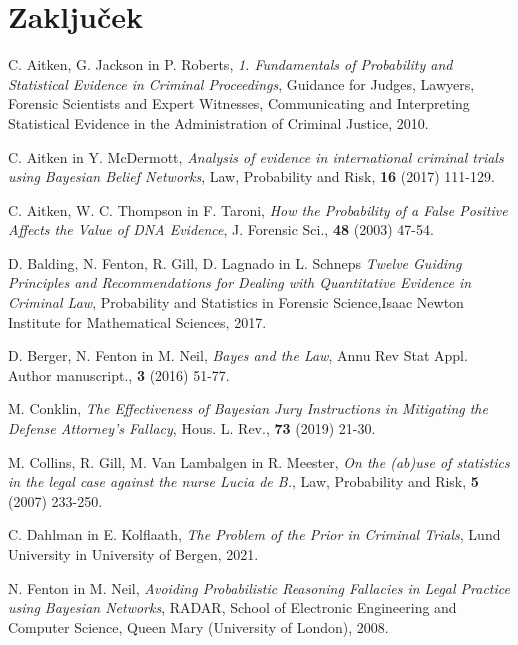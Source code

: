 \documentclass[mat1, tisk]{fmfdelo}
\theoremstyle{definition} %
\theoremstyle{trditev} %
\theoremstyle{izrek}
\begin{document}
\section{Zaključek}

\begin{thebibliography}{99}
        C. Aitken, G. Jackson in P. Roberts, \emph{1. Fundamentals of Probability and Statistical Evidence in Criminal Proceedings}, Guidance for Judges, Lawyers, Forensic Scientists and Expert Witnesses, Communicating and Interpreting Statistical Evidence in the Administration of Criminal Justice, 2010.

        C. Aitken in Y. McDermott, \emph{Analysis of evidence in international criminal trials using Bayesian Belief Networks}, Law, Probability and Risk, \textbf{16} (2017) 111-129.

        C. Aitken, W. C. Thompson in F. Taroni, \emph{How the Probability of a False Positive Affects the Value of DNA Evidence}, J. Forensic Sci., \textbf{48} (2003) 47-54.

        D. Balding, N. Fenton, R. Gill, D. Lagnado in L. Schneps \emph{Twelve Guiding Principles and Recommendations for Dealing with Quantitative Evidence in Criminal Law}, Probability and Statistics in Forensic Science,Isaac Newton Institute for Mathematical Sciences, 2017.

        D. Berger, N. Fenton in M. Neil, \emph{Bayes and the Law}, Annu Rev Stat Appl. Author manuscript., \textbf{3} (2016) 51-77.

        M. Conklin, \emph{The Effectiveness of Bayesian Jury Instructions in Mitigating the Defense Attorney's Fallacy}, Hous. L. Rev., \textbf{73} (2019) 21-30.

        M. Collins, R. Gill, M. Van Lambalgen in R. Meester, \emph{On the (ab)use of statistics in the legal case against the nurse Lucia de B.}, Law, Probability and Risk, \textbf{5} (2007) 233-250.

        C. Dahlman in E. Kolflaath, \emph{The Problem of the Prior in Criminal Trials}, Lund University in University of Bergen, 2021.

        N. Fenton in M. Neil, \emph{Avoiding Probabilistic Reasoning Fallacies in Legal Practice using Bayesian Networks}, RADAR, School of Electronic Engineering and Computer Science, Queen Mary (University of London), 2008.


\end{thebibliography}
\end{document}
